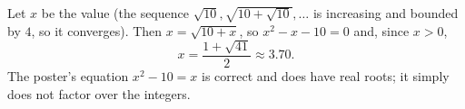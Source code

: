 Let $x$ be the value (the sequence $\sqrt{10},\sqrt{10+\sqrt{10}},\dots$ is increasing and bounded by $4$, so it converges). Then $x=\sqrt{10+x}$, so $x^2-x-10=0$ and, since $x>0$,
\[x=\boxed{\dfrac{1+\sqrt{41}}{2}}\approx3.70.\]
The poster's equation $x^2-10=x$ is correct and does have real roots; it simply does not factor over the integers.
